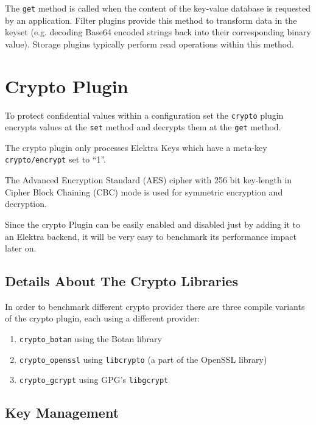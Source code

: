 The \texttt{get} method is called when the content of the key-value
database is requested by an application.
Filter plugins provide this method to transform data in the keyset (e.g. decoding Base64 encoded strings back into their corresponding binary value).
Storage plugins typically perform read operations within this method.

\section{Crypto Plugin}\label{crypto-plugin}

To protect confidential values within a configuration set the
\texttt{crypto} plugin encrypts values at the \texttt{set} method and
decrypts them at the \texttt{get} method.

The crypto plugin only processes Elektra Keys which have a meta-key
\texttt{crypto/encrypt} set to ``1''.

The Advanced Encryption Standard (AES) cipher with 256 bit key-length in
Cipher Block Chaining (CBC) mode is used for symmetric encryption and
decryption.

Since the crypto Plugin can be easily enabled and disabled just by adding it to an Elektra backend,
it will be very easy to benchmark its performance impact later on.

\subsection{Details About The Crypto
Libraries}\label{details-about-the-crypto-libraries}

In order to benchmark different crypto provider there are three compile
variants of the crypto plugin, each using a different provider:

\begin{enumerate}
\def\labelenumi{\arabic{enumi}.}
\tightlist
\item
  \texttt{crypto\_botan} using the Botan library
\item
  \texttt{crypto\_openssl} using \texttt{libcrypto} (a part of the
  OpenSSL library)
\item
  \texttt{crypto\_gcrypt} using GPG's \texttt{libgcrypt}
\end{enumerate}

\subsection{Key Management}\label{key-management}

